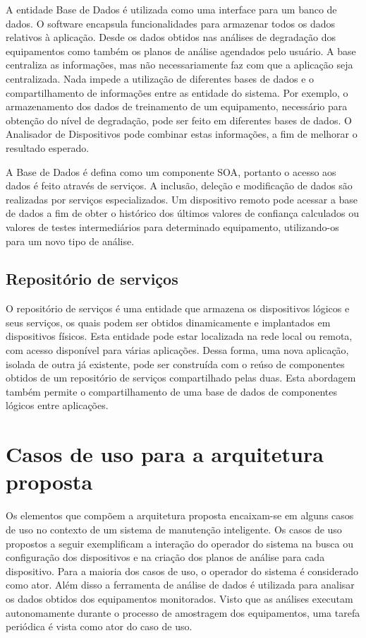 A entidade Base de Dados é utilizada como uma interface para um banco de dados. O software encapsula
funcionalidades para  armazenar todos os dados relativos à aplicação. Desde os dados obtidos nas
análises de degradação dos equipamentos como também os planos de análise agendados pelo usuário. A
base centraliza as informações, mas não necessariamente faz com que a aplicação seja centralizada.
Nada impede a utilização de diferentes bases de dados e o compartilhamento de informações entre as
entidade do sistema. Por exemplo, o armazenamento dos dados de treinamento de um equipamento,
necessário para obtenção do nível de degradação, pode ser feito em diferentes bases de dados. O
Analisador de Dispositivos pode combinar estas informações, a fim de melhorar o resultado esperado.

A Base de Dados é defina como um componente \gls{SOA}, portanto o acesso aos dados é feito através
de serviços. A inclusão, deleção e modificação de dados são realizadas por serviços especializados.
Um dispositivo remoto pode acessar a base de dados a fim de obter o histórico dos últimos valores de
confiança calculados ou valores de testes intermediários para determinado equipamento, utilizando-os
para um novo tipo de análise.


\subsection{Repositório de serviços}

O repositório de serviços é uma entidade que armazena os dispositivos lógicos e seus serviços, os
quais podem ser obtidos dinamicamente e implantados em dispositivos físicos. Esta entidade pode
estar localizada na rede local ou remota, com acesso disponível para várias aplicações. Dessa forma,
uma nova aplicação, isolada de outra já existente, pode ser construída com o reúso de componentes
obtidos de um repositório de serviços compartilhado pelas duas. Esta abordagem também permite o
compartilhamento de uma base de dados de componentes lógicos entre aplicações.


\section{Casos de uso para a arquitetura proposta}

Os elementos que compõem a arquitetura proposta encaixam-se em alguns casos de uso no contexto de um
sistema de manutenção inteligente. Os casos de uso propostos a seguir exemplificam a interação do
operador do sistema na busca ou configuração dos dispositivos e na criação dos planos de análise
para cada dispositivo. Para a maioria dos casos de uso, o operador do sistema é considerado como
ator. Além disso a ferramenta de análise de dados é utilizada para analisar os dados obtidos dos
equipamentos monitorados. Visto que as análises executam autonomamente durante o processo de
amostragem dos equipamentos, uma tarefa periódica é vista como ator do caso de uso.


